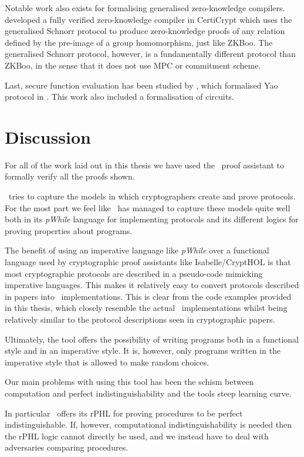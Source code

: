 Notable work also exists for formalising generalised zero-knowledge compilers.
\citet{zkcrypt} developed a fully verified zero-knowledge compiler in CertiCrypt
which uses the generalised Schnorr protocol to produce zero-knowledge proofs of
any relation defined by the pre-image of a group homomorphism, just like ZKBoo.
The generalised Schnorr protocol, however, is a fundamentally different protocol
than ZKBoo, in the sense that it does not use MPC or commitment scheme.

Last, secure function evaluation has been studied by \citet{Yao}, which
formalised Yao protocol in \easycrypt. This work also included a formalisation
of circuits.


\section{Discussion}
\label{sec:discussion}
For all of the work laid out in this thesis we have used the \easycrypt\ proof
assistant to formally verify all the proofs shown.

\easycrypt\ tries to capture the models in which cryptographers create and prove
protocols. For the most part we feel like \easycrypt\ has managed to capture
these models quite well both in its \textit{pWhile} language for implementing
protocols and its different logics for proving properties about programs.

The benefit of using an imperative language like \textit{pWhile} over a functional
language used by cryptographic proof assistants like Isabelle/CryptHOL is that most
cryptographic protocols are described in a pseudo-code mimicking imperative
languages. This makes it relatively easy to convert protocols described in
papers into \easycrypt\ implementations. This is clear from the code examples
provided in this thesis, which closely resemble the actual \easycrypt\
implementations whilst being relatively similar to the protocol descriptions
seen in cryptographic papers.

Ultimately, the tool offers the possibility of writing programs both in a
functional style and in an imperative style. It is, however, only programs
written in the imperative style that is allowed to make random choices.

Our main problems with using this tool has been the schism between computation
and perfect indistinguishability and the tools steep learning curve.

In particular \easycrypt\ offers its rPHL for proving procedures to be perfect
indistinguishable. If, however, computational indistinguishability is needed then
the rPHL logic cannot directly be used, and we instead have to deal with
adversaries comparing procedures.

